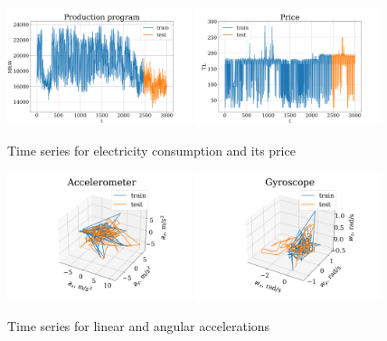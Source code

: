 \documentclass[referee, pdflatex, sn-mathphys-num]{sn-jnl}
\theoremstyle{definition}
\theoremstyle{plain}
\begin{document}
	\begin{figure}[h]
		\centering
		\includegraphics[width=0.48\textwidth, keepaspectratio]{Electricity_Production}
		\includegraphics[width=0.48\textwidth, keepaspectratio]{Electricity_Price}
		\caption{Time series for electricity consumption and its price}\label{fig:electr_data}
	\end{figure}
	
	\begin{figure}[h]
		\centering
		\includegraphics[width=0.48\textwidth, keepaspectratio]{acceleromter_example.png}
		\includegraphics[width=0.48\textwidth, keepaspectratio]{gyro_example.png}
		\caption{Time series for linear and angular accelerations}\label{fig:motion_data}
	\end{figure}
	
\end{document}
